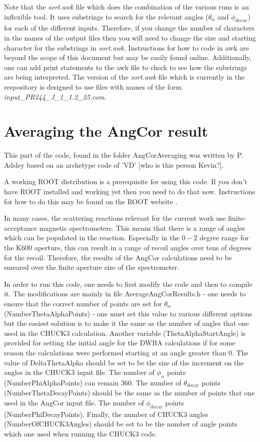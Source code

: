 \documentclass[a4paper,10pt]{article}
\begin{document}
Note that the {\it sort.awk} file which does the combination of the various runs is an inflexible tool. It uses substrings to search for the relevant angles ($\theta_\alpha$ and $\phi_\mathrm{decay}$) for each of the different inputs. Therefore, if you change the number of characters in the names of the output files then you will need to change the size and starting character for the substrings in {\it sort.awk}. Instructions for how to code in awk are beyond the scope of this document but may be easily found online. Additionally, one can add print statements to the awk file to check to see how the substrings are being interpreted. The version of the {\it sort.awk} file which is currently in the respository is designed to use files with names of the form {\it input\_PR244\_J\_1\_1.2\_25.com}.



\section{Averaging the AngCor result}

This part of the code, found in the folder AngCorAveraging was written by P. Adsley based on an archetype code of 'VD' [who is this person Kevin?].

A working ROOT distribution is a prerequisite for using this code. If you don't have ROOT installed and working yet then you need to do that now. Instructions for how to do this may be found on the ROOT website \url{}.

In many cases, the scattering reactions relevant for the current work use finite-acceptance magnetic spectrometers. This means that there is a range of angles which can be populated in the reaction. Especially in the $0-2$ degree range for the K600 aperture, this can result in a range of recoil angles over tens of degrees for the recoil. Therefore, the results of the AngCor calculations need to be smeared over the finite aperture size of the spectrometer.

In order to run this code, one needs to first modify the code and then to compile it. The modifications are mainly in file AverageAngCorResults.h - one needs to ensure that the correct number of points are set for $\theta_\alpha$ (NumberThetaAlphaPoints) - one must set this value to various different options but the easiest solution is to make it the same as the number of angles that one used in the CHUCK3 calculation. Another variable (ThetaAlphaStartAngle) is provided for setting the initial angle for the DWBA calculations if for some reason the calculations were performed starting at an angle greater than 0\textdegree. The value of DeltaThetaAlpha should be set to be the size of the increment on the angles in the CHUCK3 input file. The number of $\phi_\alpha$ points (NumberPhiAlphaPoints) can remain 360. The number of $\theta_\mathrm{decay}$ points (NumberThetaDecayPoints) should be the same as the number of points that one used in the AngCor input file. The number of $\phi_\mathrm{decay}$ points (NumberPhiDecayPoints). Finally, the number of CHUCK3 angles (NumberOfCHUCK3Angles) should be set to be the number of angle points which one used when running the CHUCK3 code.
\end{document}
